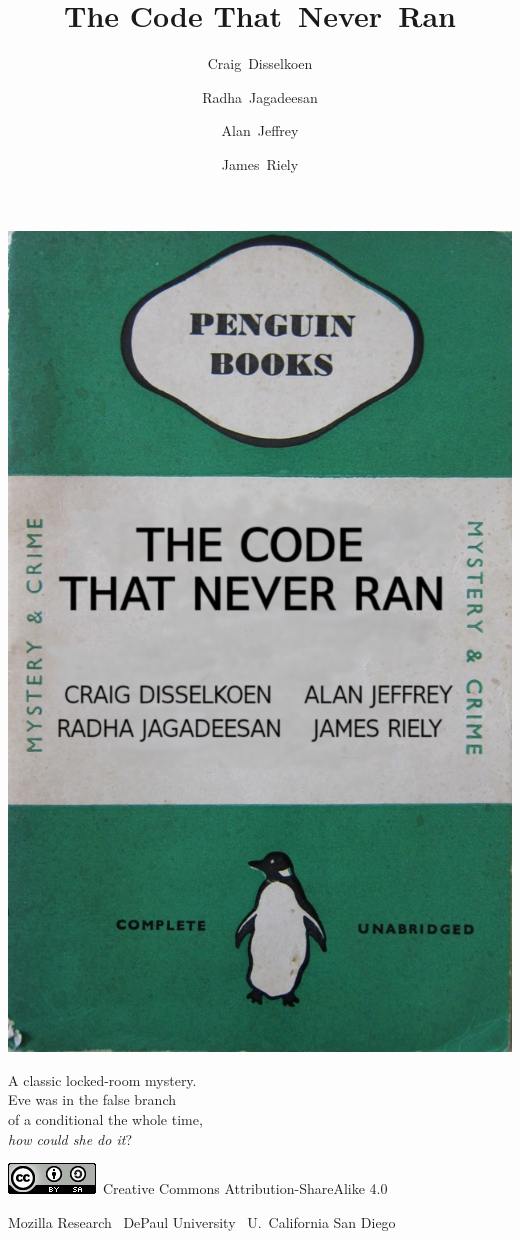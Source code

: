 \documentclass[aspectratio=169]{beamer}
\title{The Code That~Never~Ran}
\author{Craig~Disselkoen \and Radha~Jagadeesan \and Alan~Jeffrey \and James~Riely}
\begin{document}
\begin{frame}[plain]
  \includegraphics[height=.9\textheight]{green-penguin.jpg}
  \begin{minipage}[b][.9\textheight]{.8\textwidth}\raggedleft
    A classic locked-room mystery.\\
    Eve was in the false branch\\
    of a conditional the whole time,\\
    \emph{how could she do it}?

    \vss

    \tiny
    \includegraphics[height=1.5ex]{cc-by-88x31.png}~Creative Commons Attribution-ShareAlike 4.0

    Mozilla Research \textbar~DePaul University \textbar~U.~California San Diego
  \end{minipage}
\end{frame}
\end{document}
